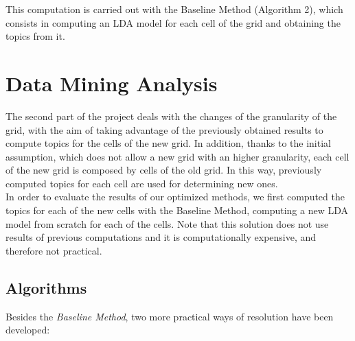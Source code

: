 This computation is carried out with the Baseline Method (Algorithm 2), which consists in computing an LDA model for each cell of the grid and obtaining the topics from it.

\begin{algorithm}
  
    
\end{algorithm}


\section{Data Mining Analysis}

The second part of the project deals with the changes of the granularity of the grid, with the aim of taking advantage of the previously obtained results to compute topics for the cells of the new grid. In addition, thanks to the initial assumption, which does not allow a new grid with an higher granularity, each cell of the new grid is composed by cells of the old grid. In this way, previously computed topics for each cell are used for determining new ones.\\

In order to evaluate the results of our optimized methods, we first computed the topics for each of the new cells with the Baseline Method, computing a new LDA model from scratch for each of the cells. Note that this solution does not use results of previous computations and it is computationally expensive, and therefore not practical.

\subsection{Algorithms}

Besides the \emph{Baseline Method}, two more practical ways of resolution have been developed:  

